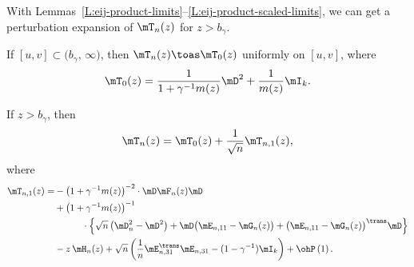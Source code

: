 With Lemmas~\ref{L:eij-product-limits}--\ref{L:eij-product-scaled-limits},
we can get a perturbation expansion of $\mT_{n}(z)$ for $z > b_\gamma$.

\begin{lemma}
    If $[u,v] \subset \big( b_\gamma, \, \infty \big)$, then
    \(
        \mT_n( z )
            \toas
                \mT_0( z )
    \)
    uniformly on $[u,v]$, where
    \begin{equation}
        \mT_0( z )
            =
                \frac{1}{ 1 + \gamma^{-1} m(z) }
                \mD^2 
                +
                \frac{1}{m(z)}
                \mI_k.
    \end{equation}
\end{lemma}

\begin{lemma}
    If $z > b_\gamma$, then
    \begin{equation}
        \mT_n( z ) 
            = 
                \mT_0( z )
                +
                \frac{1}{\sqrt{n}}
                \mT_{n,1}( z ),
    \end{equation}
    where
    \begin{align}
            \mT_{n,1}( z )
                = 
                &-
                \big( 1 + \gamma^{-1} m(z) \big)^{-2}
                    \cdot
                    \mD \mF_n(z) \mD \notag \\
                &+
                \big( 1 + \gamma^{-1} m(z) \big)^{-1} \notag \\
                    &\quad\quad\quad\cdot
                    \Big\{
                        \sqrt{n} \left( \mD_n^2 - \mD^2 \right)
                        + 
                        \mD \big( \mE_{n,11} - \mG_n(z) \big)
                        + 
                        \big( \mE_{n,11} - \mG_n(z) \big)^\trans \mD
                    \Big\}  \notag \\
                &-
                z \, \mH_n(z)
                +
                \sqrt{n}
                \left(
                    \frac{1}{n} \mE_{n,31}^\trans \mE_{n,31}
                    -
                    (1 - \gamma^{-1})
                    \mI_k
                \right)
                +
                \ohP\left( 1 \right).
    \end{align}
\end{lemma}
